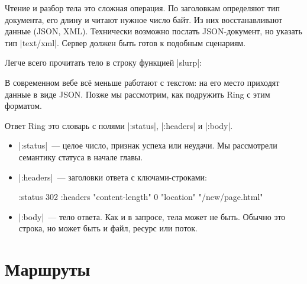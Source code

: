 
Чтение и разбор тела это сложная операция. По заголовкам определяют тип
документа, его длину и читают нужное число байт. Из них восстанавливают данные
(JSON, XML). Технически возможно послать JSON-документ, но указать тип
\spverb|text/xml|. Сервер должен быть готов к подобным сценариям.

Легче всего прочитать тело в строку функцией \spverb|slurp|:

\begin{english}
\end{english}

В современном вебе вс\"{е} меньше работают с текстом: на его место приходят данные в
виде JSON. Позже мы рассмотрим, как подружить Ring с этим форматом.


Ответ Ring это словарь с полями \spverb|:status|, \spverb|:headers| и
\spverb|:body|.

\begin{itemize}

\item
  \spverb|:status|~--- целое число, признак успеха или неудачи. Мы рассмотрели
  семантику статуса в начале главы.

\item
  \spverb|:headers|~--- заголовки ответа с ключами-строками:


\begin{english}
  \begin{clojure}
{:status 302
 :headers {"content-length" 0
           "location" "/new/page.html"}}
  \end{clojure}
\end{english}

\item
  \spverb|:body|~--- тело ответа. Как и в запросе, тела может не быть. Обычно
  это строка, но может быть и файл, ресурс или поток.

\end{itemize}

\section{Маршруты}

